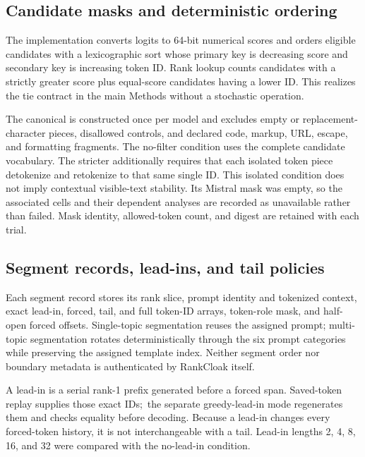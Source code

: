 \documentclass[fleqn,10pt]{wlscirep}
\DeclareRobustCommand{\code}[1]{\path{#1}}
\begin{document}
\subsection*{Candidate masks and deterministic ordering}

The implementation converts logits to 64-bit numerical scores and orders eligible candidates with a lexicographic sort whose primary key is decreasing score and secondary key is increasing token ID. Rank lookup counts candidates with a strictly greater score plus equal-score candidates having a lower ID. This realizes the tie contract in the main Methods without a stochastic operation.

The canonical \code{safe_text_filter_v1} is constructed once per model and excludes empty or replacement-character pieces, disallowed controls, and declared code, markup, URL, escape, and formatting fragments. The no-filter condition uses the complete candidate vocabulary. The stricter \code{roundtrip_stable_filter_v1} additionally requires that each isolated token piece detokenize and retokenize to that same single ID. This isolated condition does not imply contextual visible-text stability. Its Mistral mask was empty, so the associated cells and their dependent analyses are recorded as unavailable rather than failed. Mask identity, allowed-token count, and digest are retained with each trial.

\subsection*{Segment records, lead-ins, and tail policies}

Each segment record stores its rank slice, prompt identity and tokenized context, exact lead-in, forced, tail, and full token-ID arrays, token-role mask, and half-open forced offsets. Single-topic segmentation reuses the assigned prompt; multi-topic segmentation rotates deterministically through the six prompt categories while preserving the assigned template index. Neither segment order nor boundary metadata is authenticated by RankCloak itself.

A lead-in is a serial rank-1 prefix generated before a forced span. Saved-token replay supplies those exact IDs;\, the separate greedy-lead-in mode regenerates them and checks equality before decoding. Because a lead-in changes every forced-token history, it is not interchangeable with a tail. Lead-in lengths 2, 4, 8, 16, and 32 were compared with the no-lead-in condition.
\end{document}
